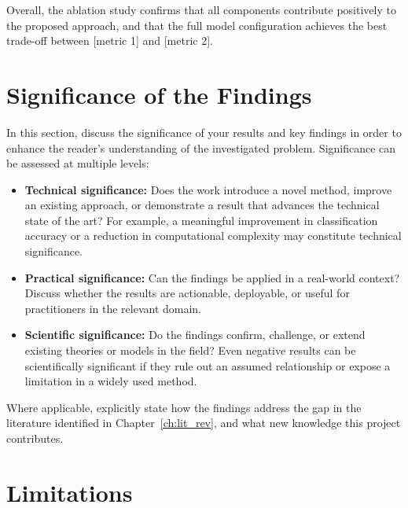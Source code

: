 \noindent Overall, the ablation study confirms that all components contribute
positively to the proposed approach, and that the full model configuration
achieves the best trade-off between [metric 1] and [metric 2].

\section{Significance of the Findings}
\label{sec:significance}

In this section, discuss the significance of your results and key findings in
order to enhance the reader's understanding of the investigated problem.
Significance can be assessed at multiple levels:

\begin{itemize}
    \item \textbf{Technical significance:} Does the work introduce a novel method,
    improve an existing approach, or demonstrate a result that advances the
    technical state of the art? For example, a meaningful improvement in
    classification accuracy or a reduction in computational complexity may
    constitute technical significance.

    \item \textbf{Practical significance:} Can the findings be applied in a
    real-world context? Discuss whether the results are actionable, deployable,
    or useful for practitioners in the relevant domain.

    \item \textbf{Scientific significance:} Do the findings confirm, challenge,
    or extend existing theories or models in the field? Even negative results
    can be scientifically significant if they rule out an assumed relationship
    or expose a limitation in a widely used method.
\end{itemize}

\noindent Where applicable, explicitly state how the findings address the gap in
the literature identified in Chapter~\ref{ch:lit_rev}, and what new knowledge
this project contributes.

\section{Limitations}
\label{sec:limitations}

